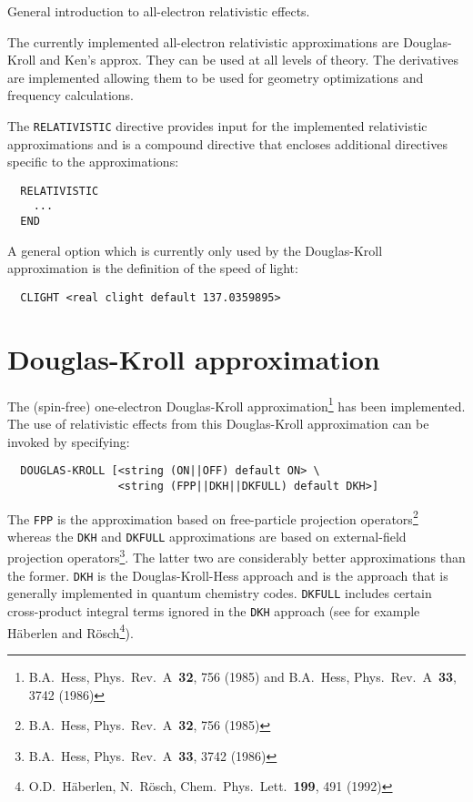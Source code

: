 \label{sec:rel}

General introduction to all-electron relativistic effects.

The currently implemented all-electron relativistic approximations are Douglas-Kroll and Ken's approx. They can be used at all levels of theory. The derivatives are implemented allowing them to be used for geometry optimizations and frequency calculations.

The \verb+RELATIVISTIC+ directive provides input for the implemented relativistic 
approximations and is a compound directive that encloses additional directives 
specific to the approximations:

\begin{verbatim}
  RELATIVISTIC
    ...
  END
\end{verbatim}

A general option which is currently only used by the Douglas-Kroll 
approximation is the definition of the speed of light:

\begin{verbatim}
  CLIGHT <real clight default 137.0359895>
\end{verbatim}

\section{Douglas-Kroll approximation}
\label{sec:douglas-kroll}

The (spin-free) one-electron Douglas-Kroll approximation\footnote{B.A.~Hess, 
Phys.~Rev.~A~{\bf 32}, 756 (1985) and B.A.~Hess, Phys.~Rev.~A~{\bf 33}, 3742 
(1986)} has been implemented. The use of relativistic effects from this 
Douglas-Kroll approximation can be invoked by specifying:

\begin{verbatim}
  DOUGLAS-KROLL [<string (ON||OFF) default ON> \
                 <string (FPP||DKH||DKFULL) default DKH>]

\end{verbatim}

The \verb+FPP+ is the approximation based on free-particle projection 
operators\footnote{B.A.~Hess, Phys.~Rev.~A~{\bf 32}, 756 (1985)} whereas the 
\verb+DKH+ and \verb+DKFULL+ approximations are based on external-field 
projection operators\footnote{B.A.~Hess, Phys.~Rev.~A~{\bf 33}, 3742 (1986)}.
The latter two are considerably better approximations than the former. \verb+DKH+ 
is the Douglas-Kroll-Hess approach and is the approach that is generally 
implemented in quantum chemistry codes. \verb+DKFULL+ includes certain 
cross-product integral terms ignored in the \verb+DKH+ approach (see for example 
H\"{a}berlen and R\"{o}sch\footnote{O.D.~H\"{a}berlen, N.~R\"{o}sch, 
Chem.~Phys.~Lett.~{\bf 199}, 491 (1992)}).

